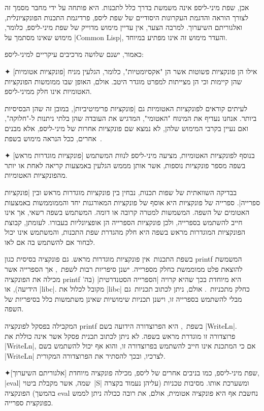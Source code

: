 אכן, שפת מיני-ליספ אינה משמשת בדרך כלל לתכנות. היא פותחה על ידי מחבר מסמך זה
לצורך הוראה והדגמת העקרונות היסודיים של שפת ליספ, פרדיגמת התכנות הפונקציונלית,
ואלגוריתם השיערוך. למרבה הצער, אין עדיין מימוש מדוייק של שפת מיני-ליספ, כלומר,
מימוש שאינו מסתמך על \E|Common Lisp|, והעדר מימוש זה אינו מפתיע במיוחד.

כאמור, ישנם שלושה מרכיבים עיקריים למיני-ליספ:
\begin{description}
  ✦ [פונקציות אטומיות] אילו הן פונקציות פשוטות אשר הן "אקסיומטיות", כלומר,
  הגלעין מניח שהן קיימות וכי הן מצייתות למפרט מוגדר היטב. אולם, האופן שבו
  ממומשות הפונקציות האטומיות אינו חלק ממיני-ליספ.

  לעיתים קוראים לפונקציות האטומיות גם \ע|פונקציות פרימיטיביות|, במובן זה שהן
  הבסיסיות ביותר. אנחנו נעדיף את המינוח "האטומי", המדגיש את העובדה שהן בלתי
  ניתנות ל-"חלוקה", ואם נעיין בקרבי המימוש שלהן, לא נמצא שם פונקציות אחרות של
  מיני-ליספ, אלא מבנים אחרים, ככל הנראה מימוש בשפת~\CPL.

  ✦ [פונקציות מוגדרות מראש] בנוסף לפונקציות האטומיות, מציעה מיני-ליספ לנוות
  המשתמש בשפה מספר פונקציות נוספות, אשר אותן מממש הגלעין באמצעות קריאה
  לאחת או יותר מהפונקציות האטומיות.

  בבדיקה השוואתית של שפות תכנות, נבחין בין פונקציות מוגדרות מראש ובין
  \ע|פונקציות ספרייה|. ספרייה של פונקציות היא אוסף של פונקציות המאורגנות יחד
  והממוממשות באמצעות האטומים של השפה. המשמשות למטרה קרובה או דומה. המשתמש
  בשפה רשאי, אך אינו חייב להשתמש בספרייה, ולכן פונקציות הספרייה הן אופציונליות
  בעבורו. לעומתן, קבוצת הפונקציות המוגדרות מראש בשפה היא חלק מהגדרת שפת התכנות,
  והמשתמש אינו יכול לבחור אם להשתמש בה אם לאו.

  בשפת התכנות~\CPL אין פונקציות מוגדרות מראש. גם פונקציה בסיסית כגון printf
  המשמשת להוצאת פלט ממוממשת כחלק מספרייה. ישנן סיפריות רבות לשפת~\CPL, אך
  הספרייה אשר מכילה את הפונקציה printf היא מיוחדת בכך שהיא קרויה \ע|הספרייה
  הסטנדרטית| (בה' הידיעה), או \E|libc|. מקובל לכלול את \E|libc| כחלק
  מתכניות~\CPL. אולם, ניתן לכתוב תכניות~\CPL גם מבלי להשתמש בספרייה זו, וישנן
  תכניות שימושיות שאינן משתמשות כלל בסיפריות של השפה.

  המקבילה בפסקל לפונקציה printf בשפת~\CPL, היא הפרוצדורה הידועה בשם
  \E|WriteLn|. פרוצדורה זו מוגדרת מראש בשפה. לא ניתן לכתוב תכנית פסקל אשר אינה
  כוללת את \E|WriteLn|, אם כי המתכנת אינו חייב להשתמש בפרוצדורה זו, והוא אף
  יכול להשתמש בשם \E|WriteLn| לצרכיו, ובכך להסתיר את הפרוצדורה המקורית.

  ✦[אלגוריתם השיערוך] שפת מיני-ליספ, כמו בניבים אחרים של ליספ, מכילה פונקציה
  מיוחדת, \E|eval| שמה, אשר מקבלת ביטוי~\E|S| ומשערכת אותו. מסיבות טכניות
  (עליהן נעמוד בקצרה בהמשך) הפונקציה eval נחשבת אף היא פונקציה אטומית, אולם, את
  רובה ככולה ניתן לממש כפונקצית ספרייה.
\end{description}

